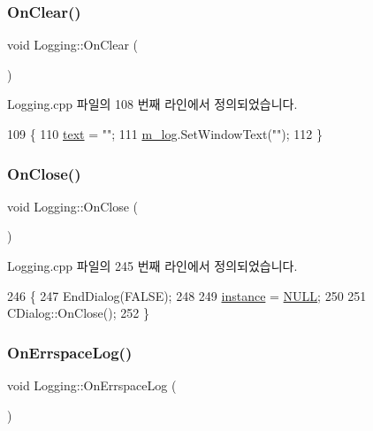 \subsubsection{\texorpdfstring{On\+Clear()}{OnClear()}}
{\footnotesize\ttfamily void Logging\+::\+On\+Clear (\begin{DoxyParamCaption}{ }\end{DoxyParamCaption})\hspace{0.3cm}{\ttfamily [protected]}}



Logging.\+cpp 파일의 108 번째 라인에서 정의되었습니다.


\begin{DoxyCode}
109 \{
110   \mbox{\hyperlink{class_logging_a4a9482d0ffecc6b04232867690fd7b21}{text}} = \textcolor{stringliteral}{""};
111   \mbox{\hyperlink{class_logging_ab1fbdc0eaf2afc3f7f493a3c9605511c}{m\_log}}.SetWindowText(\textcolor{stringliteral}{""});
112 \}
\end{DoxyCode}
\mbox{\label{class_logging_a25fa65fba20c90cf095583abc29318e7}} 
\subsubsection{\texorpdfstring{On\+Close()}{OnClose()}}
{\footnotesize\ttfamily void Logging\+::\+On\+Close (\begin{DoxyParamCaption}{ }\end{DoxyParamCaption})\hspace{0.3cm}{\ttfamily [protected]}}



Logging.\+cpp 파일의 245 번째 라인에서 정의되었습니다.


\begin{DoxyCode}
246 \{
247   EndDialog(FALSE);
248 
249   \mbox{\hyperlink{class_logging_abbc7b283056098e51d9791175abbdc23}{instance}} = \mbox{\hyperlink{getopt1_8c_a070d2ce7b6bb7e5c05602aa8c308d0c4}{NULL}};
250   
251   CDialog::OnClose();
252 \}
\end{DoxyCode}
\mbox{\label{class_logging_afe62d9f99dd8178d053c88adb90fc120}} 
\subsubsection{\texorpdfstring{On\+Errspace\+Log()}{OnErrspaceLog()}}
{\footnotesize\ttfamily void Logging\+::\+On\+Errspace\+Log (\begin{DoxyParamCaption}{ }\end{DoxyParamCaption})\hspace{0.3cm}{\ttfamily [protected]}}



